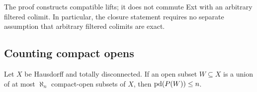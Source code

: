 \begin{remark}
The proof constructs compatible lifts; it does not commute Ext with an
arbitrary filtered colimit. In particular, the closure statement requires
no separate assumption that arbitrary filtered colimits are exact.
\end{remark}

\subsection{Counting compact opens}

\begin{proposition}\label{prop:compact-open-dimension}
Let \(X\) be Hausdorff and totally disconnected. If an open subset
\(W\subseteq X\) is a union of at most \(\aleph_n\) compact-open subsets
of \(X\), then \(\operatorname{pd}(P(W))\leq n\).
\end{proposition}

